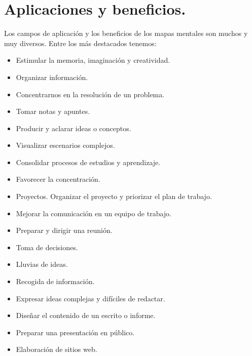 \section{Aplicaciones y beneficios.}

Los campos de aplicación y los beneficios de los mapas mentales son muchos y muy diversos. Entre los más destacados tenemos:

\begin{itemize}
\item Estimular la memoria, imaginación y creatividad.
\item Organizar información.
\item Concentrarnos en la resolución de un problema.
\item Tomar notas y apuntes.
\item Producir y aclarar ideas o conceptos. 
\item Visualizar escenarios complejos.
\item Consolidar procesos de estudios y aprendizaje.
\item Favorecer la concentración.
\item Proyectos. Organizar el proyecto y priorizar el plan de trabajo.
\item Mejorar la comunicación en un equipo de trabajo.
\item Preparar y dirigir una reunión.
\item Toma de decisiones.
\item Lluvias de ideas.
\item Recogida de información.
\item Expresar ideas complejas y difíciles de redactar.
\item Diseñar el contenido de un escrito o informe.
\item Preparar una presentación en público.
\item Elaboración de sitios web.
\end{itemize}

